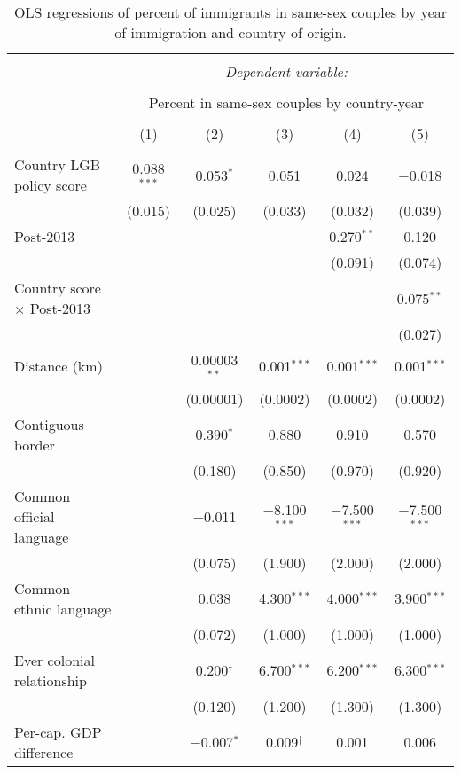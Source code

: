 \documentclass[
  11pt,
]{article}
\begin{document}
\begin{table}[H] \centering 
  \caption{OLS regressions of percent of immigrants in same-sex couples by year of immigration and country of origin.} 
  \label{tab:country-props-full} 
\begin{tabular}{@{\extracolsep{5pt}}lccccc} 
\\[-1.8ex]\hline 
\hline \\[-1.8ex] 
 & \multicolumn{5}{c}{\textit{Dependent variable:}} \\ 
\cline{2-6} 
\\[-1.8ex] & \multicolumn{5}{c}{Percent in same-sex couples by country-year} \\ 
\\[-1.8ex] & (1) & (2) & (3) & (4) & (5)\\ 
\hline \\[-1.8ex] 
 Country LGB policy score & 0.088$^{***}$ & 0.053$^{*}$ & 0.051 & 0.024 & $-$0.018 \\ 
  & (0.015) & (0.025) & (0.033) & (0.032) & (0.039) \\ 
  Post-2013 &  &  &  & 0.270$^{**}$ & 0.120 \\ 
  &  &  &  & (0.091) & (0.074) \\ 
  Country score × Post-2013 &  &  &  &  & 0.075$^{**}$ \\ 
  &  &  &  &  & (0.027) \\ 
  Distance (km) &  & 0.00003$^{**}$ & 0.001$^{***}$ & 0.001$^{***}$ & 0.001$^{***}$ \\ 
  &  & (0.00001) & (0.0002) & (0.0002) & (0.0002) \\ 
  Contiguous border &  & 0.390$^{*}$ & 0.880 & 0.910 & 0.570 \\ 
  &  & (0.180) & (0.850) & (0.970) & (0.920) \\ 
  Common official language &  & $-$0.011 & $-$8.100$^{***}$ & $-$7.500$^{***}$ & $-$7.500$^{***}$ \\ 
  &  & (0.075) & (1.900) & (2.000) & (2.000) \\ 
  Common ethnic language &  & 0.038 & 4.300$^{***}$ & 4.000$^{***}$ & 3.900$^{***}$ \\ 
  &  & (0.072) & (1.000) & (1.000) & (1.000) \\ 
  Ever colonial relationship &  & 0.200$^{†}$ & 6.700$^{***}$ & 6.200$^{***}$ & 6.300$^{***}$ \\ 
  &  & (0.120) & (1.200) & (1.300) & (1.300) \\ 
  Per-cap. GDP difference &  & $-$0.007$^{*}$ & 0.009$^{†}$ & 0.001 & 0.006 \\ 

\end{tabular}
\end{table}
\end{document}
